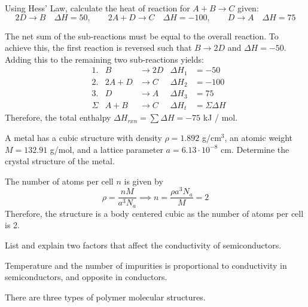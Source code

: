 \documentclass[answers]{exam}
\begin{document}
\begin{questions}
\bigskip
\question Using Hess' Law, calculate the heat of reaction for $A + B \to C$ given: \begin{equation*}
  2D \to B \quad \Delta H = 50 ,\qquad 2A + D \to C \quad \Delta H = -100 ,\qquad D \to A \quad \Delta H = 75
\end{equation*}
%
\begin{solutionbox}{2in}
  The net sum of the sub-reactions must be equal to the overall reaction. To achieve this, the first reaction is reversed such that $B \to 2D$ and $\Delta H = -50$. Adding this to the remaining two sub-reactions yields:
    \begin{align*}
      & 1. & B &\to 2D & \Delta H_1 &= -50 \\
      & 2. & 2A + D &\to C & \Delta H_2 &= -100 \\
      & 3. & D &\to A & \Delta H_3 &= 75 \\
      & \Sigma & A + B &\to C & \Delta H_t &= \Sigma \Delta H
    \end{align*}
    Therefore, the total enthalpy $\Delta H_{rxn} = \sum \Delta H = -75$ kJ / mol.
\end{solutionbox}

\bigskip
\question A metal has a cubic structure with density $\rho = 1.892$ g/cm$^3$, an atomic weight $M = 132.91$ g/mol, and a lattice parameter $a = 6.13 \cdot 10^{-8}$ cm. Determine the crystal structure of the metal.
%
\begin{solutionbox}{1.2in}
  The number of atoms per cell $n$ is given by \begin{equation*}
    \rho = \frac{nM}{a^3N_a} \implies n = \frac{\rho a^3 N_a}{M} = 2
  \end{equation*}
  Therefore, the structure is a body centered cubic as the number of atoms per cell is 2.
\end{solutionbox}

\bigskip
\question List and explain two factors that affect the conductivity of semiconductors.
%
\begin{solutionbox}{0.55in}
  Temperature and the number of impurities is proportional to conductivity in semiconductors, and opposite in conductors.
\end{solutionbox}

\bigskip
\question There are three types of polymer molecular structures.
\end{questions}
\end{document}
